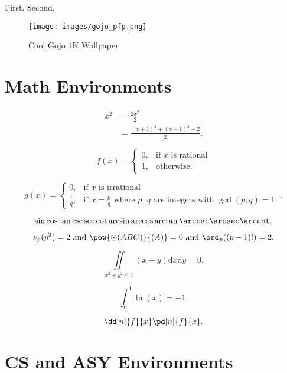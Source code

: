 \documentclass[12pt]{scrartcl}
\begin{document}
\begin{itemize}
  \ii First.
  \ii Second.
\end{itemize}

\begin{figure}[htbp]
    \centering
    \texttt{[image: images/gojo\_pfp.png]}
    \caption{Cool Gojo 4K Wallpaper}
    \label{fig:gojo1}
\end{figure}

\newpage

\section{Math Environments}


\begin{align*}
  x^2
  &= \frac{2x^2}{2}\\
  &= \frac{(x+1)^2+(x-1)^2 - 2}{2}
.\end{align*}

\[
  f(x)=\begin{cases}
    0, & \text{if } x \text{ is rational} \\
    1, & \text{otherwise}
  .\end{cases}
\]

\[
  g(x)=\begin{cases}
    0, & \text{if } x \text{ is irrational}\\
    \frac{1}{q}, & \text{if } x=\frac{p}{q}
    \text{ where $p$, $q$ are integers with $\gcd(p,q)=1$}.
  \end{cases}
.\]

\[
\sin \cos \tan \csc \sec \cot \arcsin \arccos \arctan \arccsc \arcsec \arccot
.\]

\[
\nu_p(p^2) = 2 \text{ and } \pow{\odot(ABC)}{(A)} = 0
\text{ and } \ord_p((p-1)!) = 2
.\]

\[
  \iint\limits_{x^2+y^2\le 1} (x+y)\mathrm{d}x \mathrm{d}y = 0
.\]

\[
  \int_{0}^{1} \ln(x) = -1
.\]

\[
\dd[n]{f}{x} \pd[n]{f}{x}
.\]


\newpage

\section{CS and ASY Environments}
\end{document}
